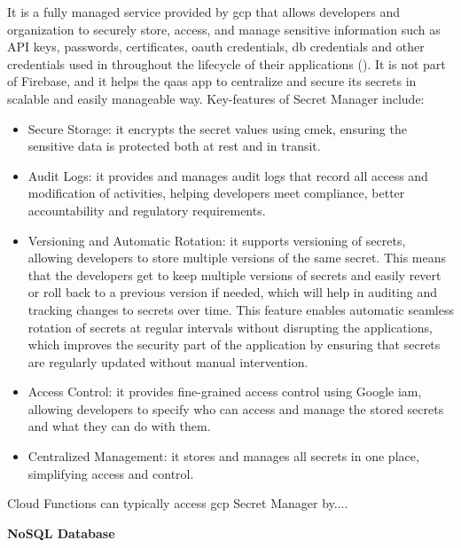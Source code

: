 \begin{multicols}{2}
      It is a fully managed service provided by \acrshort{gcp} that allows developers and organization to securely store,
      access, and manage sensitive information such as API keys, passwords, certificates, \acrshort{oauth} credentials,
      \acrshort{db} credentials and other credentials used in throughout the lifecycle of their applications
      (\cite{googlesecretmanager}). It is not part of Firebase, and it helps the \acrshort{qaas} app to centralize and
      secure its secrets in scalable and easily manageable way. Key-features of Secret Manager include:
      \begin{itemize}
            \item Secure Storage: it encrypts the secret values using \acrshort{cmek}, ensuring the sensitive data is protected
                  both at rest and in transit.
            \item Audit Logs: it provides and manages audit logs that record all access and modification of activities, helping
                  developers meet compliance, better accountability and regulatory requirements.
            \item Versioning and Automatic Rotation: it supports versioning of secrets, allowing developers to store multiple versions
                  of the same secret. This means that the developers get to keep multiple versions of secrets and easily revert or roll
                  back to a previous version if needed, which will help in auditing and tracking changes to secrets over time. This feature
                  enables automatic seamless rotation of secrets at regular intervals without  disrupting the applications, which improves
                  the security part of the application by ensuring that secrets are regularly updated without manual intervention.
            \item Access Control: it provides fine-grained access control using Google \acrshort{iam}, allowing developers to specify
                  who can access and manage the stored secrets and what they can do with them.
            \item Centralized Management: it stores and manages all secrets in one place, simplifying access and control.
      \end{itemize}
      Cloud Functions can typically access \acrshort{gcp} Secret Manager by....

      \textbf{NoSQL Database}


\end{multicols}
